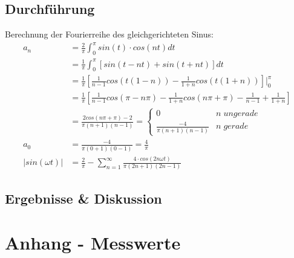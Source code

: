 \documentclass[12pt,a4paper,titlepage]{article}
\begin{document}
\subsection*{Durchf\"uhrung}

\newpage

\noindent Berechnung der Fourierreihe des gleichgerichteten Sinus:\\
\begin{align*}
    a_n &= \frac{2}{\pi}\int_{0}^{\pi}sin(t)\cdot cos(nt) dt\\
    &= \frac{1}{\pi}\int_{0}^{\pi}\left[sin(t - nt) + sin(t + nt)\right] dt\\
    &= \frac{1}{\pi}\left[\frac{1}{n-1}cos(t(1-n)) - \frac{1}{1+n}cos(t(1+n))\right]\bigr\rvert_{0}^{\pi}\\
    &= \frac{1}{\pi}\left[\frac{1}{n-1}cos(\pi-n\pi) - \frac{1}{1+n}cos(n\pi + \pi) - \frac{1}{n-1} + \frac{1}{1+n}\right]\\
    &= \frac{2cos(n\pi + \pi) - 2}{\pi(n+1)(n-1)} = \left\{
	    \begin{array}{ll}
		     0  & n \; ungerade \\
		     \frac{-4}{\pi(n+1)(n-1)} & n \; gerade
	    \end{array}
    \right.\\
    a_0 &= \frac{-4}{\pi(0+1)(0-1)} = \frac{4}{\pi}\\
    |sin(\omega t)| &= \frac{2}{\pi} - \sum_{n=1}^{\infty} \frac{4 \cdot cos(2n\omega t)}{\pi(2n+1)(2n-1)}
\end{align*}

\subsection*{Ergebnisse \& Diskussion}

\section{Anhang - Messwerte}

\end{document}
